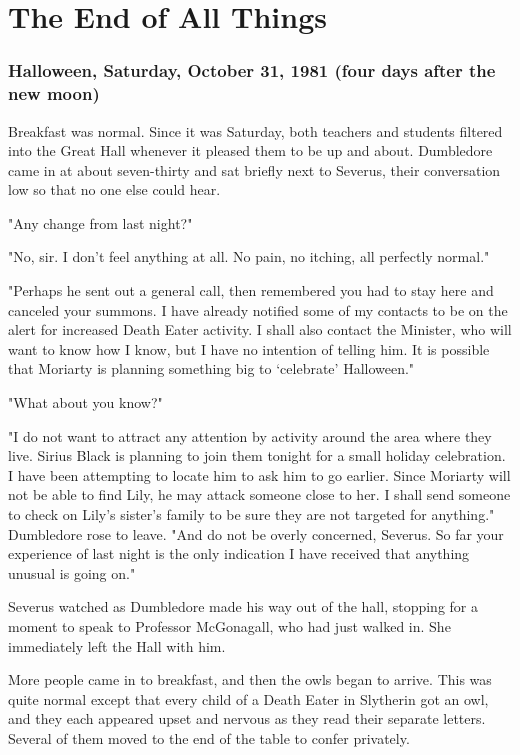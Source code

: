 
\chapter{The End of All Things}

\subsection{Halloween, Saturday, October 31, 1981 (four days after the new moon)}

Breakfast was normal. Since it was Saturday, both teachers and students filtered into the Great Hall whenever it pleased them to be up and about. Dumbledore came in at about seven-thirty and sat briefly next to Severus, their conversation low so that no one else could hear.

"Any change from last night?"

"No, sir. I don't feel anything at all. No pain, no itching, all perfectly normal."

"Perhaps he sent out a general call, then remembered you had to stay here and canceled your summons. I have already notified some of my contacts to be on the alert for increased Death Eater activity. I shall also contact the Minister, who will want to know how I know, but I have no intention of telling him. It is possible that Moriarty is planning something big to `celebrate' Halloween."

"What about{\el} you know?"

"I do not want to attract any attention by activity around the area where they live. Sirius Black is planning to join them tonight for a small holiday celebration. I have been attempting to locate him to ask him to go earlier. Since Moriarty will not be able to find Lily, he may attack someone close to her. I shall send someone to check on Lily's sister's family to be sure they are not targeted for anything." Dumbledore rose to leave. "And do not be overly concerned, Severus. So far your experience of last night is the only indication I have received that anything unusual is going on."

Severus watched as Dumbledore made his way out of the hall, stopping for a moment to speak to Professor McGonagall, who had just walked in. She immediately left the Hall with him.

More people came in to breakfast, and then the owls began to arrive. This was quite normal except that every child of a Death Eater in Slytherin got an owl, and they each appeared upset and nervous as they read their separate letters. Several of them moved to the end of the table to confer privately.

